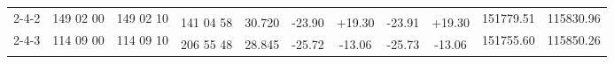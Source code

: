 \documentclass[UTF8]{ctexart}
\begin{document}
\begin{table}[h]
\begin{tabular}{|ccccccccccc|}
		\multicolumn{1}{|c|}{\multirow{2}{*}{2-4-2}}                                             & \multicolumn{1}{c|}{\multirow{2}{*}{149 02 00}}                                             & \multicolumn{1}{c|}{\multirow{2}{*}{149 02 10}}                                             & \multicolumn{1}{c|}{}                                                                       & \multicolumn{1}{c|}{}                                                                    & \multicolumn{1}{c|}{}                        & \multicolumn{1}{c|}{}                        & \multicolumn{1}{c|}{}                        & \multicolumn{1}{c|}{}                        & \multicolumn{1}{c|}{\multirow{2}{*}{151779.51}} & \multirow{2}{*}{115830.96}  \\ \cline{4-9}
		\multicolumn{1}{|c|}{}                                                                   & \multicolumn{1}{c|}{}                                                                       & \multicolumn{1}{c|}{}                                                                       & \multicolumn{1}{c|}{\multirow{2}{*}{141 04 58}}                                             & \multicolumn{1}{c|}{\multirow{2}{*}{30.720}}                                             & \multicolumn{1}{c|}{\multirow{2}{*}{-23.90}} & \multicolumn{1}{c|}{\multirow{2}{*}{+19.30}} & \multicolumn{1}{c|}{\multirow{2}{*}{-23.91}} & \multicolumn{1}{c|}{\multirow{2}{*}{+19.30}} & \multicolumn{1}{c|}{}                           &                             \\ \cline{1-3} \cline{10-11} 
		\multicolumn{1}{|c|}{\multirow{2}{*}{2-4-3}}                                             & \multicolumn{1}{c|}{\multirow{2}{*}{114 09 00}}                                             & \multicolumn{1}{c|}{\multirow{2}{*}{114 09 10}}                                             & \multicolumn{1}{c|}{}                                                                       & \multicolumn{1}{c|}{}                                                                    & \multicolumn{1}{c|}{}                        & \multicolumn{1}{c|}{}                        & \multicolumn{1}{c|}{}                        & \multicolumn{1}{c|}{}                        & \multicolumn{1}{c|}{\multirow{2}{*}{151755.60}} & \multirow{2}{*}{115850.26}  \\ \cline{4-9}
		\multicolumn{1}{|c|}{}                                                                   & \multicolumn{1}{c|}{}                                                                       & \multicolumn{1}{c|}{}                                                                       & \multicolumn{1}{c|}{\multirow{2}{*}{206 55 48}}                                             & \multicolumn{1}{c|}{\multirow{2}{*}{28.845}}                                             & \multicolumn{1}{c|}{\multirow{2}{*}{-25.72}} & \multicolumn{1}{c|}{\multirow{2}{*}{-13.06}} & \multicolumn{1}{c|}{\multirow{2}{*}{-25.73}} & \multicolumn{1}{c|}{\multirow{2}{*}{-13.06}} & \multicolumn{1}{c|}{}                           &                             \\ \cline{1-3} \cline{10-11} 

\end{tabular}
\end{table}
\end{document}
